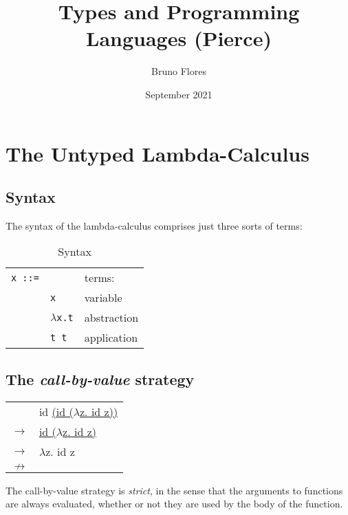 \documentclass{article}
\title{Types and Programming Languages (Pierce)}
\author{Bruno Flores}
\date{September 2021}
\begin{document}
\maketitle

\section{The Untyped Lambda-Calculus}

\subsection{Syntax}

The syntax of the lambda-calculus comprises just three sorts of terms:

\begin{table}[h!]
\begin{tabularx}{1\textwidth} 
  { >{\raggedright\arraybackslash}l
    >{\raggedright\arraybackslash}l
    >{\raggedleft\arraybackslash}X }

    \texttt{x ::=} & & terms: \\
    & \texttt{x} & variable \\
    & \(\lambda\)\texttt{x.t} & abstraction \\
    & \texttt{t t} & application \\
\end{tabularx}
\caption{Syntax}
\end{table}

\subsection{The \textit{call-by-value} strategy}

\begin{table}[h!]
\begin{tabularx}{1\textwidth} 
  { >{\raggedright\arraybackslash}l
    >{\raggedright\arraybackslash}l }

    & id \underline{(id (\(\lambda\)z. id z))} \\
    \(\rightarrow\) & \underline{id (\(\lambda\)z. id z)} \\
    \(\rightarrow\) & \(\lambda\)z. id z \\
    \(\nrightarrow\) & \\
\end{tabularx}
\end{table}

The call-by-value strategy is \textit{strict}, in the sense that the arguments to functions are always evaluated, whether or not they are used by the body of the function.
\end{document}
